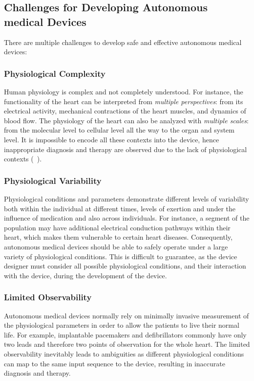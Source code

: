 \subsection{Challenges for Developing Autonomous medical Devices}
There are multiple challenges to develop safe and effective autonomous medical devices:

\subsubsection{Physiological Complexity} 
Human physiology is complex and not completely understood. 
For instance, the functionality of the heart can be interpreted from \emph{multiple perspectives}: from its electrical activity, mechanical contractions of the heart muscles, and dynamics of blood flow. 
The physiology of the heart can also be analyzed with \emph{multiple scales}: from the molecular level to cellular level all the way to the organ and system level. 
It is impossible to encode all these contexts into the device, hence inappropriate diagnosis and therapy are observed due to the lack of physiological contexts (~\cite{killedbycode, icd_recall}).
	\subsubsection{Physiological Variability}
	Physiological conditions and parameters demonstrate different levels of variability both within the individual at different times, levels of exertion and under the influence of medication and also across individuals. 
	For instance, a segment of the population may have additional electrical conduction pathways within their heart, which makes them vulnerable to certain heart diseases.
	Consequently, autonomous medical devices should be able to safely operate under a large variety of physiological conditions. 
	This is difficult to guarantee, as the device designer must consider all possible physiological conditions, and their interaction with the device, during the development of the device.
	
	\subsubsection{Limited Observability} 
	Autonomous medical devices normally rely on minimally invasive measurement of the physiological parameters in order to allow the patients to live their normal life. 
	For example, implantable pacemakers and defibrillators commonly have only two leads and therefore two points of observation for the whole heart. 
	The limited observability inevitably leads to ambiguities as different physiological conditions can map to the same input sequence to the device, resulting in inaccurate diagnosis and therapy. 


